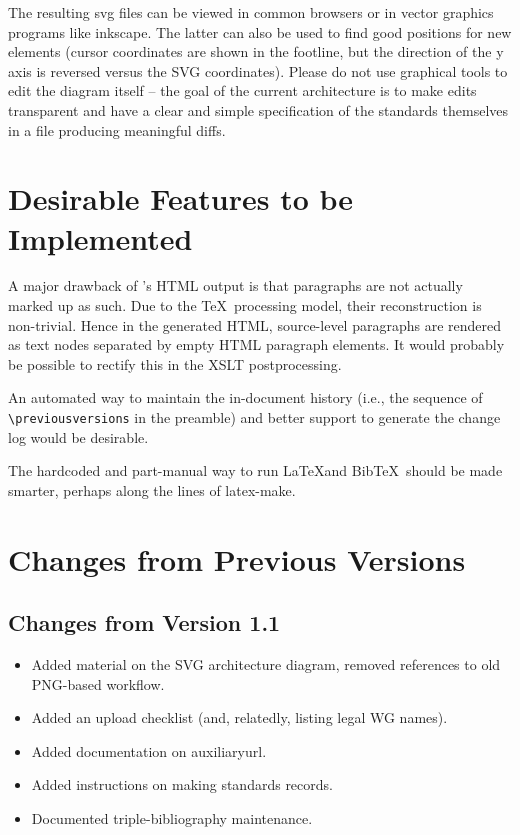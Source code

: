 \documentclass[11pt,a4paper]{ivoa}
\newcommand{\BibTeX}{BibTeX}
\begin{document}
The resulting svg files can be viewed in common browsers or in vector
graphics programs like inkscape.  The latter can also be used to find
good positions for new elements (cursor coordinates are shown in the
footline, but the direction of the y axis is reversed versus the SVG
coordinates).  Please do not use graphical tools to edit the diagram
itself -- the goal of the current architecture is to make edits
transparent and have a clear and simple specification of the standards
themselves in a file producing meaningful diffs.

\section{Desirable Features to be Implemented}

A major drawback of \ivoatex's HTML output is that paragraphs are not actually
marked up as such.  Due to the \TeX\ processing model, their
reconstruction is non-trivial.  Hence in the generated HTML,
source-level paragraphs are rendered as text nodes separated by empty
HTML paragraph elements.  It would probably be possible to rectify this
in the XSLT postprocessing.

An automated way to maintain the in-document history (i.e., the sequence
of \verb|\previousversions| in the preamble) and better support to
generate the change log would be desirable.

The hardcoded and part-manual way to run \LaTeX and \BibTeX~should be
made smarter, perhaps along the lines of latex-make.

\appendix
\section{Changes from Previous Versions}

\subsection{Changes from Version 1.1}

\begin{itemize}
\item Added material on the SVG architecture diagram, removed references
to old PNG-based workflow.
\item Added an upload checklist (and, relatedly, listing legal WG names).
\item Added documentation on auxiliaryurl.
\item Added instructions on making standards records.
\item Documented triple-bibliography maintenance.
\end{itemize}
\end{document}
